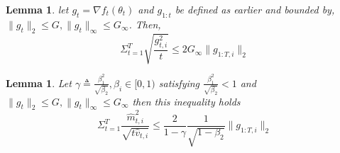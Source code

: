 \documentclass[nohyperref]{article}
\theoremstyle{plain}
\newtheorem{lemma}[theorem]{Lemma}
\theoremstyle{definition}
\theoremstyle{remark}
\begin{document}
\begin{lemma}
\label{lem:usefullemma}
let $g_{t} = \nabla f_{t}(\theta_{t}) $ and $g_{1:t}$ be defined as earlier and bounded by, $\| g_{t} \|_{2} \leq G, \| g_{t} \|_{\infty} \leq G_{\infty} $. Then,
$$\Sigma_{t=1}^{T} \sqrt{\frac{g^{2}_{t,i}}{t}} \leq 2G_{\infty} \| g_{1:T,i} \|_{2} $$
\end{lemma}

\begin{lemma}
\label{lem:usefullemma}
Let $\gamma \triangleq \frac{\beta_{1}^2}{\sqrt{\beta_{2}}}, \beta_{i} \in [0,1)$ satisfying $\frac{\beta_{1}^2}{\sqrt{\beta_{2}}} < 1$ and $\| g_{t} \|_{2} \leq G, \| g_{t} \|_{\infty} \leq G_{\infty}$ then this inequality holds  
$$ \Sigma_{t=1}^{T} \frac{\hat{m}_{t,i}^{2}}{\sqrt{t\hat{v}_{t,i}}} \leq \frac{2}{1-\gamma} \frac{1}{\sqrt{1- \beta_{2}}} \| g_{1:T,i} \|_{2}
$$
\end{lemma}
\end{document}
